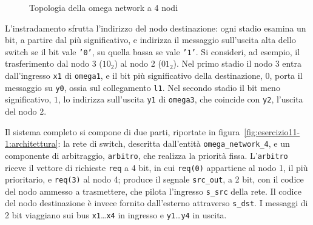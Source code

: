 \begin{figure}[htbp]
{}
  \caption{Topologia della omega network a 4 nodi}
  \label{fig:esercizio11-1:topologia}
\end{figure}

L'instradamento sfrutta l'indirizzo del nodo destinazione: ogni stadio esamina un bit, a partire dal più significativo, e indirizza il messaggio sull'uscita alta dello switch se il bit vale \texttt{'0'}, su quella bassa se vale \texttt{'1'}. Si consideri, ad esempio, il trasferimento dal nodo 3 ($10_2$) al nodo 2 ($01_2$). Nel primo stadio il nodo 3 entra dall'ingresso \texttt{x1} di \texttt{omega1}, e il bit più significativo della destinazione, $0$, porta il messaggio su \texttt{y0}, ossia sul collegamento \texttt{l1}. Nel secondo stadio il bit meno significativo, $1$, lo indirizza sull'uscita \texttt{y1} di \texttt{omega3}, che coincide con \texttt{y2}, l'uscita del nodo 2.

Il sistema completo si compone di due parti, riportate in figura~\ref{fig:esercizio11-1:architettura}: la rete di switch, descritta dall'entità \texttt{omega\_network\_4}, e un componente di arbitraggio, \texttt{arbitro}, che realizza la priorità fissa. L'\texttt{arbitro} riceve il vettore di richieste \texttt{req} a 4 bit, in cui \texttt{req(0)} appartiene al nodo 1, il più prioritario, e \texttt{req(3)} al nodo 4; produce il segnale \texttt{src\_out}, a 2 bit, con il codice del nodo ammesso a trasmettere, che pilota l'ingresso \texttt{s\_src} della rete. Il codice del nodo destinazione è invece fornito dall'esterno attraverso \texttt{s\_dst}. I messaggi di 2 bit viaggiano sui bus \texttt{x1}\ldots\texttt{x4} in ingresso e \texttt{y1}\ldots\texttt{y4} in uscita.

